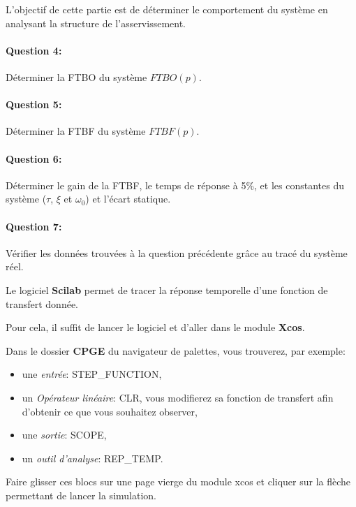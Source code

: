 L'objectif de cette partie est de déterminer le comportement du système en analysant la structure de l'asservissement.
~\

\paragraph{Question 4:} Déterminer la FTBO du système $FTBO(p)$.

\paragraph{Question 5:} Déterminer la FTBF du système $FTBF(p)$.

\paragraph{Question 6:} Déterminer le gain de la FTBF, le temps de réponse à 5\%, et les constantes du système ($\tau$, $\xi$ et $\omega_0$) et l'écart statique.

\paragraph{Question 7:} Vérifier les données trouvées à la question précédente grâce au tracé du système réel.
 

\ifdef{\public}{\cleardoublepage}{}


Le logiciel \textbf{Scilab} permet de tracer la réponse temporelle d'une fonction de transfert donnée.

Pour cela, il suffit de lancer le logiciel et d'aller dans le module \textbf{Xcos}.

Dans le dossier \textbf{CPGE} du navigateur de palettes, vous trouverez, par exemple:
\begin{itemize}
 \item une \textit{entrée}: STEP\_FUNCTION,
 \item un \textit{Opérateur linéaire}: CLR, vous modifierez sa fonction de transfert afin d'obtenir ce que vous souhaitez observer,
 \item une \textit{sortie}: SCOPE,
 \item un \textit{outil d'analyse}: REP\_TEMP.
\end{itemize}

Faire glisser ces blocs sur une page vierge du module xcos et cliquer sur la flèche permettant de lancer la simulation.

